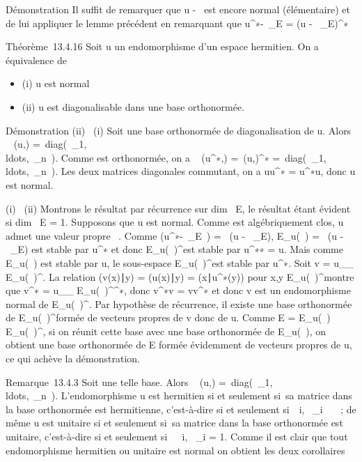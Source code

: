 \documentclass[]{article}
\begin{document}
Démonstration Il suffit de remarquer que u -
\lambda~\mathrmId est encore normal (élémentaire) et de lui
appliquer le lemme précédent en remarquant que
u^∗-\overline\lambda~\mathrmId\_E
= (u - \lambda~\mathrmId\_E)^∗

Théorème~13.4.16 Soit u un endomorphisme d'un espace hermitien. On a
équivalence de

\begin{itemize}
\itemsep1pt\parskip0pt
\item
  (i) u est normal
\item
  (ii) u est diagonalisable dans une base orthonormée.
\end{itemize}

Démonstration (ii) \rigtharrow~(i) Soit  une base orthonormée de diagonalisation
de u. Alors \mathrmMat~
(u,) =\
diag(\lambda~\_1,\\ldots,\lambda~\_n~).
Comme \mathcal{E} est orthonormée, on a
\mathrmMat~
(u^∗,) =\
\mathrmMat (u,)^∗
=\
diag(\overline\lambda~\_1,\\ldots,\overline\lambda~\_n~).
Les deux matrices diagonales commutant, on a uu^∗ =
u^∗u, donc u est normal.

(i) \rigtharrow~(ii) Montrons le résultat par récurrence sur
dim~ E, le résultat étant évident si
dim~ E = 1. Supposons que u est normal. Comme 
est algébriquement clos, u admet une valeur propre \lambda~. Comme
\mathrmKer(u^∗-\overline\lambda~\mathrmId\_E~)
= \mathrmKer~(u -
\lambda~\mathrmId\_E), E\_u(\lambda~)
= \mathrmKer~(u -
\lambda~\mathrmId\_E) est stable par u^∗
et donc E\_u(\lambda~)^\bot est stable par u^∗∗ = u.
Mais comme E\_u(\lambda~) est stable par u, le sous-espace
E\_u(\lambda~)^\bot est stable par u^∗. Soit v =
u\_\textbar{}\_ E\_u(\lambda~)^\bot. La
relation (v(x)∣y) =
(u(x)∣y) =
(x∣u^∗(y)) pour x,y \in
E\_u(\lambda~)^\bot montre que v^∗ =
u\_\textbar{}\_ E\_u(\lambda~)^\bot^∗,
donc v^∗v = vv^∗ et donc v est un endomorphisme
normal de E\_u(\lambda~)^\bot. Par hypothèse de récurrence, il
existe une base orthonormée de E\_u(\lambda~)^\bot formée de
vecteurs propres de v donc de u. Comme E = E\_u(\lambda~) \bot \oplus~
E\_u(\lambda~)^\bot, si on réunit cette base avec une base
orthonormée de E\_u(\lambda~), on obtient une base orthonormée de E
formée évidemment de vecteurs propres de u, ce qui achève la
démonstration.

Remarque~13.4.3 Soit  une telle base. Alors
\mathrmMat~ (u,)
=\
diag(\lambda~\_1,\\ldots,\lambda~\_n~).
L'endomorphisme u est hermitien si et seulement si~sa matrice dans la
base orthonormée \mathcal{E} est hermitienne, c'est-à-dire si et seulement
si~\forall~i, \lambda~\_i~ \in {}~~; de même u est
unitaire si et seulement si~sa matrice dans la base orthonormée  est
unitaire, c'est-à-dire si et seulement si~\forall~~i,
\textbar{}\lambda~\_i\textbar{} = 1. Comme il est clair que tout
endomorphisme hermitien ou unitaire est normal on obtient les deux
corollaires
\end{document}

